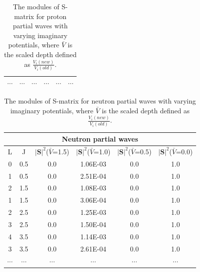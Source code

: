 \documentclass[12pt]{article}
\begin{document}
\begin{table}[]
\begin{tabular}{cccccc}
$\cdots$           &$\cdots$                    & $\cdots$                            & $\cdots$                           & $\cdots$                           & $\cdots$                                                                \\
\bottomrule
\end{tabular}
\caption{The modules of S-matrix for proton partial waves with varying imaginary potentials, where $\bar{V}$ is the scaled depth defined as $\frac{V_i(new)}{V_i(old)}$.}
\label{pSmatrix}
\end{table}

\begin{table}[]
\centering
\begin{tabular}{cccccc}
\toprule
\multicolumn{6}{c}{Neutron partial waves}                                                                         \\
 \midrule
L                     & J                     & $|\mathbf{S}|^2$($\bar{V}$=1.5) & $|\mathbf{S}|^2$($\bar{V}$=1.0) & $|\mathbf{S}|^2$($\bar{V}$=0.5) & $|\mathbf{S}|^2$($\bar{V}$=0.0) \\
0 & 0.5 & 0.0                          & 1.06E-03                     & 0.0                          & 1.0                          \\
1 & 0.5 & 0.0                          & 2.51E-04                     & 0.0                          & 1.0                          \\
2 & 1.5 & 0.0                          & 1.08E-03                     & 0.0                          & 1.0                          \\
1 & 1.5 & 0.0                          & 3.06E-04                     & 0.0                          & 1.0                          \\
2 & 2.5 & 0.0                          & 1.25E-03                     & 0.0                          & 1.0                          \\
3 & 2.5 & 0.0                          & 1.50E-04                     & 0.0                          & 1.0                          \\
4 & 3.5 & 0.0                          & 1.14E-03                     & 0.0                          & 1.0                          \\
3 & 3.5 & 0.0                          & 2.61E-04                     & 0.0                          & 1.0                          \\   
$\cdots$           &$\cdots$                    & $\cdots$                            & $\cdots$                           & $\cdots$                           & $\cdots$                                                                \\
\bottomrule
\end{tabular}
\caption{The modules of S-matrix for neutron partial waves with varying imaginary potentials, where $\bar{V}$ is the scaled depth defined as $\frac{V_i(new)}{V_i(old)}$.}
\label{nSmatrix}
\end{table}
	
\end{document}
